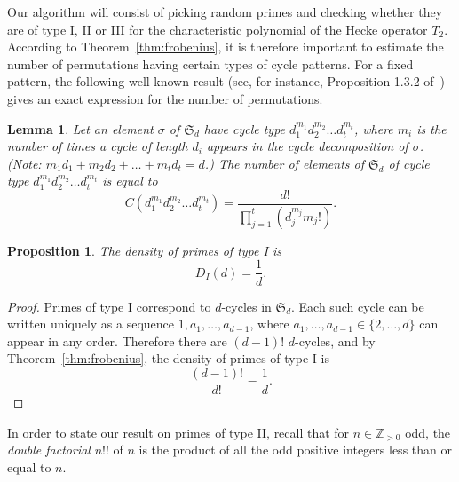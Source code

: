 \documentclass[11pt]{article}
\theoremstyle{plain}
\newtheorem{lemma}[theorem]{Lemma}
\newtheorem{proposition}[theorem]{Proposition}
\theoremstyle{definition}
\theoremstyle{remark}
\numberwithin{equation}{section}
\newcommand{\ZZ}{\mathbb{Z}}
\renewcommand{\SS}{\mathfrak{S}}
\begin{document}
Our algorithm will consist of picking random primes and checking whether they
are of type I, II or III for the characteristic polynomial of the Hecke
operator $T_2$.  According to Theorem~\ref{thm:frobenius}, 
it is therefore important to estimate the number of permutations having
certain types of cycle patterns.  For a fixed pattern, the following
well-known result 
(see, for instance, Proposition 1.3.2 of~\cite{Stanley1}) gives an exact
expression for the number of permutations.

\begin{lemma}\label{lem:cycletype}
  Let an element $\sigma$ of $\SS_d$ have cycle type $d_1^{m_1}d_2^{m_2}\ldots d_t^{m_t}$, 
  where $m_i$ is the number of times a cycle of length $d_i$ appears in the cycle
  decomposition of $\sigma$. (Note: $m_1d_1+m_2d_2+\ldots +m_td_t=d$.) The number
   of elements of $\SS_d$ of cycle type $d_1^{m_1}d_2^{m_2}\ldots d_t^{m_t}$ is equal to
  \begin{equation*}
    C(d_1^{m_1}d_2^{m_2}\ldots d_t^{m_t})=\frac{d!}{\prod_{j=1}^t\left(d_j^{m_j}m_j!\right)}.
  \end{equation*}
\end{lemma}


\begin{proposition}\label{prop:type1}
  The density of primes of type I is 
  \begin{equation*}
    D_I(d)=\frac{1}{d}.
  \end{equation*}
\end{proposition}
\begin{proof}
  Primes of type I correspond to $d$-cycles in $\SS_d$.  Each such cycle can
  be written uniquely as a sequence $1,a_1,\ldots,a_{d-1}$, where
  $a_1,\ldots,a_{d-1}\in\{2,\ldots,d\}$ can appear in any order.  Therefore
  there are $(d-1)!$ $d$-cycles, and by Theorem~\ref{thm:frobenius},
  the density of primes of type I is
  \begin{equation*}
    \frac{(d-1)!}{d!}=\frac{1}{d}.
  \end{equation*}
\end{proof}

In order to state our result on primes of type II, recall that
for $n\in\ZZ_{>0}$ odd, the \emph{double factorial} $n!!$ of $n$ is
the product of all the odd positive integers less than or equal to $n$.
\end{document}
